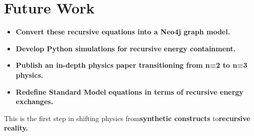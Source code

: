 \documentclass{article}
\begin{document}
\section{Future Work}
\begin{itemize}
    \item\textbf{Convert these recursive equations into a Neo4j graph model.}
    \item\textbf{Develop Python simulations for recursive energy containment.}
    \item\textbf{Publish an in-depth physics paper transitioning from n=2 to n=3 physics.}
    \item\textbf{Redefine Standard Model equations in terms of recursive energy exchanges.}
\end{itemize}
This is the first step in shifting physics from\textbf{synthetic constructs} to\textbf{recursive reality.}
\end{document}
